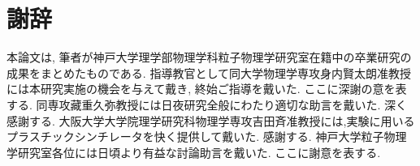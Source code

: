 \chapter*{謝辞}\label{thanks}


本論文は, 筆者が神戸大学理学部物理学科粒子物理学研究室在籍中の卒業研究の成果をまとめたものである.
指導教官として同大学物理学専攻身内賢太朗准教授には本研究実施の機会を与えて戴き, 終始ご指導を戴いた.
ここに深謝の意を表する.
同専攻藏重久弥教授には日夜研究全般にわたり適切な助言を戴いた.
深く感謝する.
大阪大学大学院理学研究科物理学専攻吉田斉准教授には,実験に用いるプラスチックシンチレータを快く提供して戴いた.
感謝する.
神戸大学粒子物理学研究室各位には日頃より有益な討論助言を戴いた.
ここに謝意を表する.
